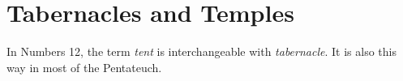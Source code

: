 \chapter{Tabernacles and Temples}\label{app:tabernacle}
In Numbers 12, the term \textit{tent} is interchangeable with \textit{tabernacle}. It is also this way in most of the Pentateuch.
